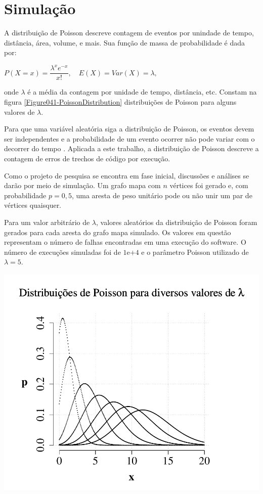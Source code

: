 
\section{Simulação}

A distribuição de Poisson descreve contagem de eventos por unindade de tempo,
distância, área, volume, e mais. Sua função de massa de probabilidade é dada
por:

\begin{center}
  $P(X=x)=\dfrac{\lambda^{x}e^{-x}}{x!}, \quad E(X)=Var(X)=\lambda,$
\end{center}

\noindent onde $\lambda$ é a média da contagem por unidade de tempo, distância,
etc. Constam na figura \ref{Figure041-PoissonDistribution} distribuições de
Poisson para alguns valores de $\lambda$.

Para que uma variável aleatória siga a distribuição de Poisson, os eventos devem
ser independentes e a probabilidade de um evento ocorrer não pode variar com o
decorrer do tempo \cite{JBstatisticsPoissonIntroduction}
\cite{JBstatisticsPoissonOrNot}. Aplicada a este trabalho, a distribuição de
Poisson descreve a contagem de erros de trechos de código por execução.

Como o projeto de pesquisa se encontra em fase inicial, discussões e análises se
darão por meio de simulação. Um grafo mapa com $n$ vértices foi gerado e, com
probabilidade $p=0,5$, uma aresta de peso unitário pode ou não unir um par de
vértices quaisquer.

Para um valor arbitrário de $\lambda$, valores aleatórios da
distribuição de Poisson foram gerados para cada aresta do grafo mapa simulado.
Os valores em questão representam o número de falhas encontradas em uma execução
do software. O número de execuções simuladas foi de $1\mathrm{e}{+4}$ e o
parâmetro Poisson utilizado de $\lambda=5$.

{
  \centering
  \captionsetup{type=figure}
	\includegraphics[scale=0.45]{./figures/Figure041-PoissonDistribution.pdf}
	\label{Figure041-PoissonDistribution}
}
